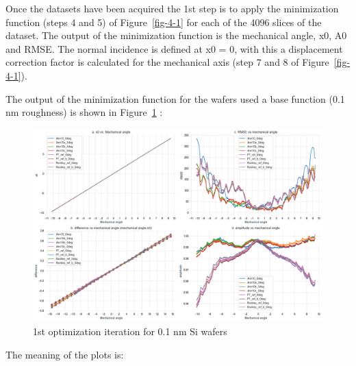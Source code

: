 \documentclass[
  letterpaper,
  DIV=11,
  numbers=noendperiod,
  oneside]{scrreprt}
\begin{document}
Once the datasets have been acquired the 1st step is to apply the
minimization function (steps 4 and 5) of Figure~\ref{fig-4-1} for each
of the 4096 slices of the dataset. The output of the minimization
function is the mechanical angle, x0, A0 and RMSE. The normal incidence
is defined at x0 = 0, with this a displacement correction factor is
calculated for the mechanical axis (step 7 and 8 of
Figure~\ref{fig-4-1}).

The output of the minimization function for the wafers used a base
function (0.1 nm roughness) is shown in Figure~\ref{fig-4-3} :

\begin{figure}

{\centering \includegraphics{notebooks/c_optimization_files/figure-pdf/fig-4-3-output-1.png}

}

\caption{\label{fig-4-3}1st optimization iteration for 0.1 nm Si wafers}

\end{figure}

The meaning of the plots is:
\end{document}
